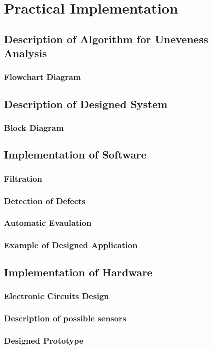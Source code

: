 \documentclass[twoside]{ctuthesis}
\theoremstyle{plain}
\theoremstyle{definition}
\theoremstyle{note}
\begin{document}
\chapter{Practical Implementation}
\section{Description of Algorithm for Uneveness Analysis}
\subsection{Flowchart Diagram}
\section{Description of Designed System}
\subsection{Block Diagram}
\section{Implementation of Software}
\subsection{Filtration}
\subsection{Detection of Defects}
\subsection{Automatic Evaulation}
\subsection{Example of Designed Application}
\section{Implementation of Hardware}
\subsection{Electronic Circuits Design}
\subsection{Description of possible sensors}
\subsection{Designed Prototype}
\end{document}
